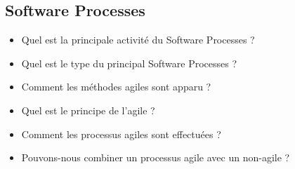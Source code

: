 \subsection{Software Processes}


\begin{itemize}
	\item Quel est la principale activité du Software Processes ?
	\item Quel est le type du principal Software Processes ?
	\item Comment les méthodes agiles sont apparu ?
	\item Quel est le principe de l'agile ?
	\item Comment les processus agiles sont effectuées ?
	\item Pouvons-nous combiner un processus agile avec un non-agile ?
\end{itemize}